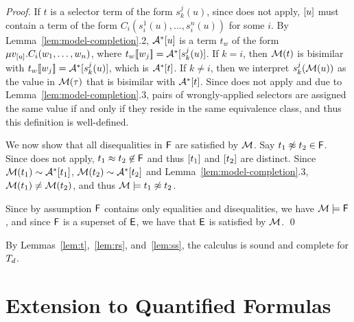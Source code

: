 \begin{proof}
If $t$ is a selector term of the form $s^j_k( u )$,
since  does not apply, 
$[ u ]$ must contain a term of the form $C_i( s^1_i( u ), \ldots, s^{n}_i( u ) )$ for some $i$.
By Lemma~\ref{lem:model-completion}.2, $\mathcal{A}^\ast [ u ]$ is a term $t_w$ of the form
$\mu v_{[ u ]}. C_i( w_1, \ldots, w_n )$,
where $t_w [\![  w_j  ]\!] = \mathcal{A}^\ast [  s^j_k( u ) ]$. 
If $k = i$, then $\mathcal{M}( t )$ is bisimilar with $t_w[\![ w_j ]\!] = \mathcal{A}^\ast [  s^j_k( u ) ]$,
which is $\mathcal{A}^\ast [ t ]$.
If $k \neq i$, then we interpret $s^j_k( \mathcal{M}( u ) )$ as the value in $\mathcal{M}( \tau )$ that is bisimilar with $\mathcal{A}^\ast [  t  ]$.
Since  does not apply and due to Lemma~\ref{lem:model-completion}.3, 
pairs of wrongly-applied selectors are assigned the same value if and only if they reside in the same equivalence class,
and thus this definition is well-defined.

We now show that all disequalities in $\mathsf{F}$ are satisfied by $\mathcal{M}$.
Say $t_1 \not\approx t_2 \in \mathsf{F}$.
Since  does not apply, $t_1 \approx t_2 \not\in \mathsf{F}$ and thus $[ t_1 ]$ and $[ t_2 ]$ are distinct.
Since $\mathcal{M}( t_1 ) \sim \mathcal{A}^\ast [ t_1 ]$, $\mathcal{M}( t_2 ) \sim \mathcal{A}^\ast [ t_2 ]$
and Lemma~\ref{lem:model-completion}.3, $\mathcal{M}( t_1 ) \neq \mathcal{M}( t_2 )$, and thus $\mathcal{M} \models t_1 \not\approx t_2$.

Since by assumption $\mathsf{F}$ contains only equalities and disequalities, we have $\mathcal{M} \models \mathsf{F}$,
and since $\mathsf{F}$ is a superset of $\mathsf{E}$, we have that $\mathsf{E}$ is satisfied by $\mathcal{M}$.
\qed
\end{proof}

By Lemmas~\ref{lem:t},~\ref{lem:rs}, and~\ref{lem:ss}, the calculus is sound and complete for $T_{d}$.

\section{Extension to Quantified Formulas}
\label{sec:extension-to-quantified-formulas}

